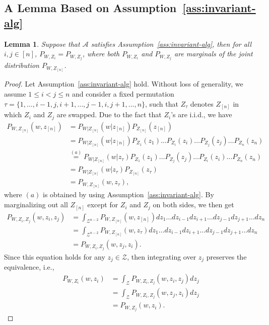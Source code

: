 \documentclass[onecolumn,romanappendices,10pt]{IEEEtran}
\newtheorem{lemma}{Lemma}
\newcommand{\Acal}{{\mathcal A}}
\newcommand{\Zcal}{{\mathcal Z}}
\begin{document}
	\subsection{A Lemma Based on Assumption~\ref{ass:invariant-alg}} \label{subapp:invariant_alg}
	\begin{lemma} \label{lem:inv_alg}
		Suppose that $\Acal$ satisfies Assumption~\ref{ass:invariant-alg}, then for all $i, j \in [n]$, $P_{W, Z_i} = P_{W, Z_j}$, where both $P_{W, Z_i}$ and $P_{W, Z_j}$ are marginals of the joint distribution $P_{W, Z_{[n]}}$.
	\end{lemma}
	\begin{proof}
		Let Assumption~\ref{ass:invariant-alg} hold. Without loss of generality, we assume $1\leq i<j\leq n$ and consider a fixed permutation $\tau = \{1,\ldots,i-1,j,i+1,\ldots,j-1,i,j+1,\ldots,n\}$, such that $Z_{\tau}$ denotes $Z_{[n]}$ in which $Z_i$ and $Z_j$ are swapped. Due to the fact that $Z_i$'s are i.i.d., we have
		\begin{equation}
			\begin{aligned}
				P_{W, Z_{[n]}} (w, z_{[n]}) &= P_{W| Z_{[n]}} (w | z_{[n]}) P_{Z_{[n]}}(z_{[n]}) \\
				&= P_{W| Z_{[n]}} (w | z_{[n]}) P_{Z_1}(z_1) \ldots P_{Z_i}(z_i) \ldots P_{Z_j}(z_j) \ldots P_{Z_n}(z_n) \\
				&\overset{(a)}{=} P_{W| Z_{[n]}} (w | z_{\tau}) P_{Z_1}(z_1) \ldots P_{Z_j}(z_j) \ldots P_{Z_i}(z_i) \ldots P_{Z_n}(z_n) \\
				&= P_{W| Z_{[n]}} (w | z_{\tau}) P_{Z_{[n]}}(z_{\tau}) \\
				&= P_{W, Z_{[n]}} (w, z_{\tau}),
			\end{aligned}
		\end{equation}
		where $(a)$ is obtained by using Assumption~\ref{ass:invariant-alg}. By marginalizing out all $Z_{[n]}$ except for $Z_i$ and $Z_j$ on both sides, we then get
		\begin{equation}
			\begin{aligned}
				P_{W, Z_i, Z_j} (w, z_i, z_j) &= \int_{\Zcal^{n-2}} P_{W, Z_{[n]}} (w, z_{[n]}) d z_1 \ldots d z_{i-1} d z_{i+1} \ldots d z_{j-1} d z_{j+1} \ldots d z_n \\
				&= \int_{\Zcal^{n-2}} P_{W, Z_{[n]}} (w, z_{\tau}) d z_1 \ldots d z_{i-1} d z_{i+1} \ldots d z_{j-1} d z_{j+1} \ldots d z_n \\
				&= P_{W, Z_i, Z_j} (w, z_j, z_i).
			\end{aligned}
		\end{equation}
		Since this equation holds for any $z_j \in \Zcal$, then integrating over $z_j$ preserves the equivalence, i.e.,
		\begin{equation}
			\begin{aligned}
				P_{W, Z_i} (w, z_i) &= \int_{\Zcal} P_{W, Z_i, Z_j} (w, z_i, z_j) d z_j \\
				&= \int_{\Zcal} P_{W, Z_i, Z_j} (w, z_j, z_i) d z_j \\
				&= P_{W, Z_j} (w, z_i).
			\end{aligned} \label{eq:invariant_i_j}
		\end{equation}
	\end{proof}
\end{document}
